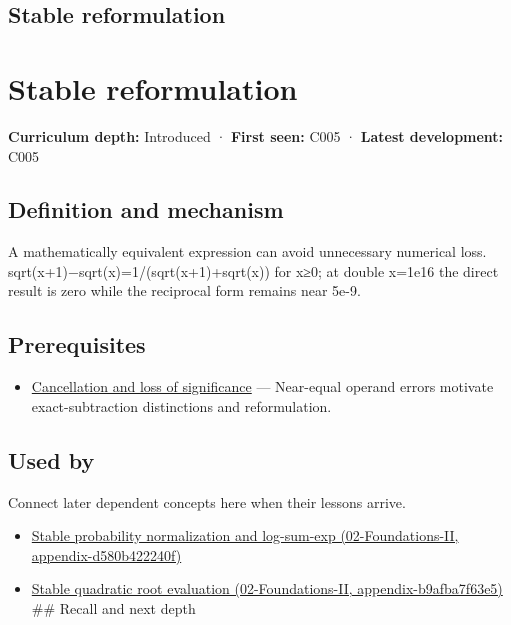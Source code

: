 \hypertarget{appendix-d7f8ba961670}{}
\section*{Stable reformulation}
\chapter{Stable reformulation}\label{appendix-d7f8ba961670-stable-reformulation}

\textbf{Curriculum depth:} Introduced · \textbf{First seen:} C005 · \textbf{Latest development:} C005

\section{Definition and mechanism}\label{appendix-d7f8ba961670-definition-and-mechanism}

A mathematically equivalent expression can avoid unnecessary numerical loss. sqrt(x+1)−sqrt(x)=1/(sqrt(x+1)+sqrt(x)) for x≥0; at double x=1e16 the direct result is zero while the reciprocal form remains near 5e-9.

\section{Prerequisites}\label{appendix-d7f8ba961670-prerequisites}

\begin{itemize}
\tightlist
\item
  \hyperref[appendix-a2773a6a2f9d]{Cancellation and loss of significance} --- Near-equal operand errors motivate exact-subtraction distinctions and reformulation.
\end{itemize}

\section{Used by}\label{appendix-d7f8ba961670-used-by}

Connect later dependent concepts here when their lessons arrive.

\begin{itemize}
\tightlist
\item
  \href{../02-Foundations-II/main.pdf\#nameddest=appendix-d580b422240f}{Stable probability normalization and log-sum-exp (02-Foundations-II, appendix-d580b422240f)}
\item
  \href{../02-Foundations-II/main.pdf\#nameddest=appendix-b9afba7f63e5}{Stable quadratic root evaluation (02-Foundations-II, appendix-b9afba7f63e5)} \#\# Recall and next depth
\end{itemize}

